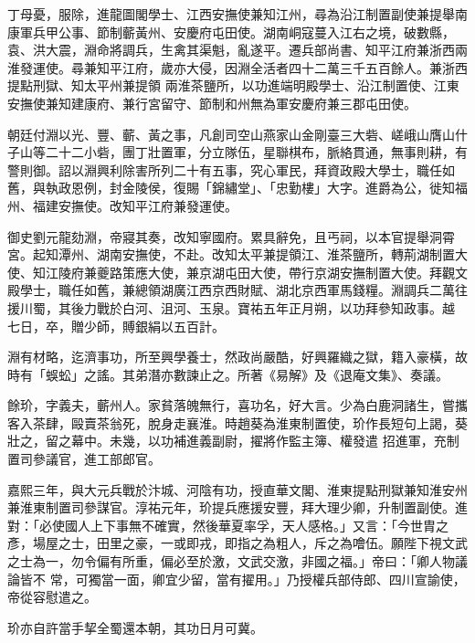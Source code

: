 \begin{pinyinscope}
 丁母憂，服除，進龍圖閣學士、江西安撫使兼知江州，尋為沿江制置副使兼提舉南康軍兵甲公事、節制蘄黃州、安慶府屯田使。湖南峒寇蔓入江右之境，破數縣，袁、洪大震，淵命將調兵，生禽其渠魁，亂遂平。遷兵部尚書、知平江府兼浙西兩淮發運使。尋兼知平江府，歲亦大侵，因淵全活者四十二萬三千五百餘人。兼浙西提點刑獄、知太平州兼提領
 兩淮茶鹽所，以功進端明殿學士、沿江制置使、江東安撫使兼知建康府、兼行宮留守、節制和州無為軍安慶府兼三郡屯田使。



 朝廷付淵以光、豐、蘄、黃之事，凡創司空山燕家山金剛臺三大砦、嵯峨山膺山什子山等二十二小砦，團丁壯置軍，分立隊伍，星聯棋布，脈絡貫通，無事則耕，有警則御。詔以淵興利除害所列二十有五事，究心軍民，拜資政殿大學士，職任如舊，與執政恩例，封金陵侯，復賜「錦繡堂」、「忠勤樓」大字。進爵為公，徙知福
 州、福建安撫使。改知平江府兼發運使。



 御史劉元龍劾淵，帝寢其奏，改知寧國府。累具辭免，且丐祠，以本官提舉洞霄宮。起知潭州、湖南安撫使，不赴。改知太平兼提領江、淮茶鹽所，轉荊湖制置大使、知江陵府兼夔路策應大使，兼京湖屯田大使，帶行京湖安撫制置大使。拜觀文殿學士，職任如舊，兼總領湖廣江西京西財賦、湖北京西軍馬錢糧。淵調兵二萬往援川蜀，其後力戰於白河、沮河、玉泉。寶祐五年正月朔，以功拜參知政事。越
 七日，卒，贈少師，賻銀絹以五百計。



 淵有材略，迄濟事功，所至興學養士，然政尚嚴酷，好興羅織之獄，籍入豪橫，故時有「蜈蚣」之謠。其弟潛亦數諫止之。所著《易解》及《退庵文集》、奏議。



 餘玠，字義夫，蘄州人。家貧落魄無行，喜功名，好大言。少為白鹿洞諸生，嘗攜客入茶肆，毆賣茶翁死，脫身走襄淮。時趙葵為淮東制置使，玠作長短句上謁，葵壯之，留之幕中。未幾，以功補進義副尉，擢將作監主簿、權發遣
 招進軍，充制置司參議官，進工部郎官。



 嘉熙三年，與大元兵戰於汴城、河陰有功，授直華文閣、淮東提點刑獄兼知淮安州兼淮東制置司參謀官。淳祐元年，玠提兵應援安豐，拜大理少卿，升制置副使。進對：「必使國人上下事無不確實，然後華夏率孚，天人感格。」又言：「今世胄之彥，場屋之士，田里之豪，一或即戎，即指之為粗人，斥之為噲伍。願陛下視文武之士為一，勿令偏有所重，偏必至於激，文武交激，非國之福。」帝曰：「卿人物議論皆不
 常，可獨當一面，卿宜少留，當有擢用。」乃授權兵部侍郎、四川宣諭使，帝從容慰遣之。



 玠亦自許當手挈全蜀還本朝，其功日月可冀。




\end{pinyinscope}

